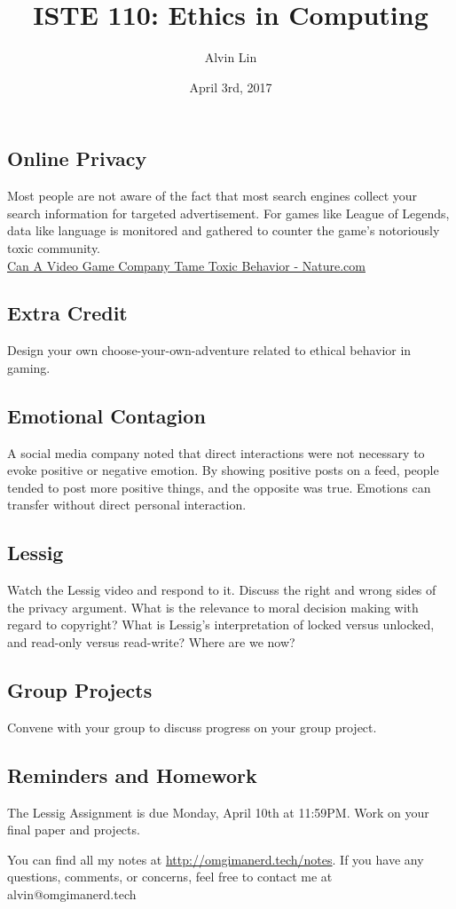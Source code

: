 \documentclass[letterpaper, 12pt]{article}
\title{ISTE 110: Ethics in Computing}
\author{Alvin Lin}
\date{April 3rd, 2017}
\begin{document}
\maketitle

\subsection*{Online Privacy}
Most people are not aware of the fact that most search engines collect your
search information for targeted advertisement. For games like League of
Legends, data like language is monitored and gathered to counter the game's
notoriously toxic community. \\
\href{http://www.nature.com/news/can-a-video-game-company-tame-toxic-behaviour-1.19647}{Can A Video Game Company Tame Toxic Behavior - Nature.com}

\subsection*{Extra Credit}
Design your own choose-your-own-adventure related to ethical behavior in
gaming.

\subsection*{Emotional Contagion}
A social media company noted that direct interactions were not necessary to
evoke positive or negative emotion. By showing positive posts on a feed,
people tended to post more positive things, and the opposite was true.
Emotions can transfer without direct personal interaction.

\subsection*{Lessig}
Watch the Lessig video and respond to it. Discuss the right and wrong sides
of the privacy argument. What is the relevance to moral decision making with
regard to copyright? What is Lessig's interpretation of locked versus unlocked,
and read-only versus read-write? Where are we now?

\subsection*{Group Projects}
Convene with your group to discuss progress on your group project.

\subsection*{Reminders and Homework}
The Lessig Assignment is due Monday, April 10th at 11:59PM.
Work on your final paper and projects.

\begin{center}
  You can find all my notes at \url{http://omgimanerd.tech/notes}. If you have
  any questions, comments, or concerns, feel free to contact me at
  alvin@omgimanerd.tech
\end{center}
\end{document}
